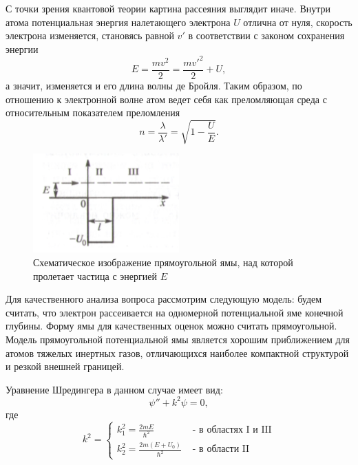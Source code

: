 \documentclass[14pt,a4paper]{scrartcl}
\begin{document}
С точки зрения квантовой теории картина рассеяния выглядит иначе. Внутри атома потенциальная энергия налетающего электрона $U$ отлична от нуля, скорость электрона изменяется, становясь равной $v'$ в соответствии с законом сохранения энергии
\begin{equation}
E = \frac{m v^2}{2} = \frac{m v'^2}{2} + U,
\end{equation}
а значит, изменяется и его длина волны де Бройля. Таким образом, по отношению к электронной волне атом ведет себя как преломляющая среда с относительным показателем преломления
\begin{equation}
n = \frac{\lambda}{\lambda'} = \sqrt{1 - \frac{U}{E}}.
\end{equation}




\begin{figure}[h]
\begin{center}
\includegraphics[width = 0.5\textwidth]{problem.png}
\caption{Схематическое изображение прямоугольной ямы, над которой пролетает частица с энергией $E$}
\end{center}
\end{figure}






Для качественного анализа вопроса рассмотрим следующую модель: будем считать, что электрон рассеивается на одномерной потенциальной яме конечной глубины. Форму ямы для качественных оценок можно считать прямоугольной. Модель прямоугольной потенциальной ямы является хорошим приближением для атомов тяжелых инертных газов, отличающихся наиболее компактной структурой и резкой внешней границей.

Уравнение Шредингера в данном случае имеет вид:
\begin{equation}
\psi'' + k^2 \psi = 0, 
\end{equation}
где
\begin{equation}
k^2 = 
\begin{cases}
k_1^2 = \frac{2mE}{\hbar^2} & \text{ - в областях I и III}\\
k_2^2 = \frac{2m(E+U_0)}{\hbar^2} & \text{ - в области II}
\end{cases}
\end{equation}
\end{document}
